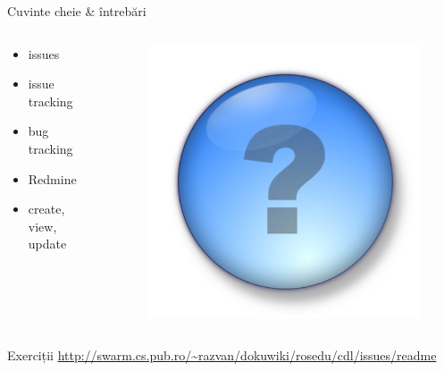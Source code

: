 \documentclass{beamer}
\begin{document}
\begin{frame}{Cuvinte cheie \& întrebări}
  \begin{columns}
    \begin{column}[l]{0.5\textwidth}
      \begin{itemize}
        \item issues
        \item issue tracking
        \item bug tracking
        \item Redmine
        \item create, view, update
      \end{itemize}
    \end{column}
    \begin{column}[c]{0.5\textwidth}
      \begin{figure}
        \includegraphics[scale=0.4]{img/question-mark.jpg}
      \end{figure}
    \end{column}
  \end{columns}
\end{frame}

\begin{frame}{Exerciții}
  \footnotesize \url{http://swarm.cs.pub.ro/~razvan/dokuwiki/rosedu/cdl/issues/readme}
\end{frame}
\end{document}
